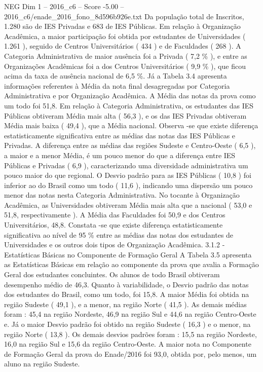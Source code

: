 \begin{textsample}{NEG Dim 1 – 2016\_c6 – Score -5.00 – 2016\_c6/enade\_2016\_fono\_8d596b926e.txt}
Da população total de Inscritos, 1.280 são de IES Privadas e 683 de IES Públicas.
Em relação à Organização Acadêmica, a maior participação foi obtida por estudantes de Universidades ( 1.261 ), seguido de Centros Universitários ( 434 ) e de Faculdades ( 268 ).
A Categoria Administrativa de maior ausência foi a Privada ( 7,2 \% ), e entre as Organizações Acadêmicas foi a dos Centros Universitários ( 9,9 \% ), que ficou acima da taxa de ausência nacional de 6,5 \%.
Já a Tabela 3.4 apresenta informações referentes à Média da nota final desagregadas por Categoria Administrativa e por Organização Acadêmica.
A Média das notas da prova como um todo foi 51,8.
Em relação à Categoria Administrativa, os estudantes das IES Públicas obtiveram Média mais alta ( 56,3 ), e os das IES Privadas obtiveram Média mais baixa ( 49,4 ), que a Média nacional.
Observa -se que existe diferença estatisticamente significativa entre as médias das notas das IES Públicas e Privadas.
A diferença entre as médias das regiões Sudeste e Centro-Oeste ( 6,5 ), a maior e a menor Média, é um pouco menor do que a diferença entre IES Públicas e Privadas ( 6,9 ), caracterizando uma diversidade administrativa um pouco maior do que regional.
O Desvio padrão para as IES Públicas ( 10,8 ) foi inferior ao do Brasil como um todo ( 11,6 ), indicando uma dispersão um pouco menor das notas nesta Categoria Administrativa.
No tocante à Organização Acadêmica, as Universidades obtiveram Média mais alta que a nacional ( 53,0 e 51,8, respectivamente ).
A Média das Faculdades foi 50,9 e dos Centros Universitários, 48,8.
Constata -se que existe diferença estatisticamente significativa ao nível de 95 \% entre as médias das notas dos estudantes de Universidades e os outros dois tipos de Organização Acadêmica. 3.1.2 - Estatísticas Básicas no Componente de Formação Geral A Tabela 3.5 apresenta as Estatísticas Básicas em relação ao componente da prova que avalia a Formação Geral dos estudantes concluintes.
Os alunos de todo Brasil obtiveram desempenho médio de 46,3.
Quanto à variabilidade, o Desvio padrão das notas dos estudantes do Brasil, como um todo, foi 15,8.
A maior Média foi obtida na região Sudeste ( 49,1 ), e a menor, na região Norte ( 41,5 ).
As demais médias foram : 45,4 na região Nordeste, 46,9 na região Sul e 44,6 na região Centro-Oeste e.
Já o maior Desvio padrão foi obtido na região Sudeste ( 16,3 ) e o menor, na região Norte ( 13,8 ).
Os demais desvios padrões foram : 15,5 na região Nordeste, 16,0 na região Sul e 15,6 da região Centro-Oeste.
A maior nota no Componente de Formação Geral da prova do Enade/2016 foi 93,0, obtida por, pelo menos, um aluno na região Sudeste.

\end{textsample}
